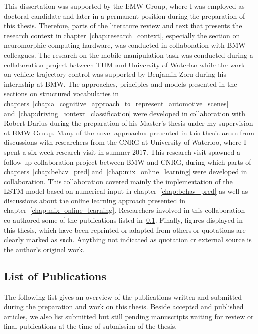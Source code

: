 This dissertation was supported by the \ac{BMW} Group, where I was employed as doctoral candidate and later in a permanent position during the preparation of this thesis.
Therefore, parts of the literature review and text that presents the research context in chapter~\ref{chap:research_context}, especially the section on neuromorphic computing hardware, was conducted in collaboration with \ac{BMW} colleagues.
The research on the mobile manipulation task was conducted during a collaboration project between \ac{TUM} and University of Waterloo while the work on vehicle trajectory control was supported by Benjamin Zorn during his internship at \ac{BMW}.
The approaches, principles and models presented in the sections on structured vocabularies in chapters~\ref{chap:a_cognitive_approach_to_represent_automotive_scenes} and~\ref{chap:driving_context_classification} were developed in collaboration with Robert Darius during the preparation of his Master's thesis \cite{Darius2018} under my supervision at \ac{BMW} Group.
Many of the novel approaches presented in this thesis arose from discussions with researchers from the \ac{CNRG} at University of Waterloo, where I spent a six week research visit in summer 2017.
This research visit spawned a follow-up collaboration project between \ac{BMW} and \ac{CNRG}, during which parts of chapters~\ref{chap:behav_pred} and~\ref{chap:mix_online_learning} were developed in collaboration.
This collaboration covered mainly the implementation of the \ac{LSTM} model based on numerical input in chapter~\ref{chap:behav_pred} as well as discussions about the online learning approach presented in chapter~\ref{chap:mix_online_learning}.
Researchers involved in this collaboration co-authored some of the publications listed in~\ref{subsec:list_of_publications}.
Finally, figures displayed in this thesis, which have been reprinted or adapted from others or quotations are clearly marked as such.
Anything not indicated as quotation or external source is the author's original work.

\subsection{List of Publications}%
\label{subsec:list_of_publications}

The following list gives an overview of the publications written and submitted during the preparation and work on this thesis.
Beside accepted and published articles, we also list submitted but still pending manuscripts waiting for review or final publications at the time of submission of the thesis.

